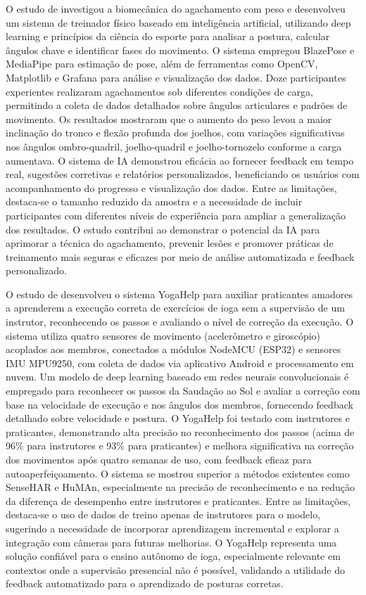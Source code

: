 O estudo de  investigou a biomecânica do agachamento com peso e desenvolveu um sistema de treinador físico baseado em inteligência artificial, utilizando deep learning e princípios da ciência do esporte para analisar a postura, calcular ângulos chave e identificar fases do movimento. O sistema empregou BlazePose e MediaPipe para estimação de pose, além de ferramentas como OpenCV, Matplotlib e Grafana para análise e visualização dos dados. Doze participantes experientes realizaram agachamentos sob diferentes condições de carga, permitindo a coleta de dados detalhados sobre ângulos articulares e padrões de movimento. Os resultados mostraram que o aumento do peso levou a maior inclinação do tronco e flexão profunda dos joelhos, com variações significativas nos ângulos ombro-quadril, joelho-quadril e joelho-tornozelo conforme a carga aumentava. O sistema de IA demonstrou eficácia ao fornecer feedback em tempo real, sugestões corretivas e relatórios personalizados, beneficiando os usuários com acompanhamento do progresso e visualização dos dados. Entre as limitações, destaca-se o tamanho reduzido da amostra e a necessidade de incluir participantes com diferentes níveis de experiência para ampliar a generalização dos resultados. O estudo contribui ao demonstrar o potencial da IA para aprimorar a técnica do agachamento, prevenir lesões e promover práticas de treinamento mais seguras e eficazes por meio de análise automatizada e feedback personalizado.

O estudo de  desenvolveu o sistema YogaHelp para auxiliar praticantes amadores a aprenderem a execução correta de exercícios de ioga sem a supervisão de um instrutor, reconhecendo os passos e avaliando o nível de correção da execução. O sistema utiliza quatro sensores de movimento (acelerômetro e giroscópio) acoplados aos membros, conectados a módulos NodeMCU (ESP32) e sensores IMU MPU9250, com coleta de dados via aplicativo Android e processamento em nuvem. Um modelo de deep learning baseado em redes neurais convolucionais é empregado para reconhecer os passos da Saudação ao Sol e avaliar a correção com base na velocidade de execução e nos ângulos dos membros, fornecendo feedback detalhado sobre velocidade e postura. O YogaHelp foi testado com instrutores e praticantes, demonstrando alta precisão no reconhecimento dos passos (acima de 96\% para instrutores e 93\% para praticantes) e melhora significativa na correção dos movimentos após quatro semanas de uso, com feedback eficaz para autoaperfeiçoamento. O sistema se mostrou superior a métodos existentes como SenseHAR e HuMAn, especialmente na precisão de reconhecimento e na redução da diferença de desempenho entre instrutores e praticantes. Entre as limitações, destaca-se o uso de dados de treino apenas de instrutores para o modelo, sugerindo a necessidade de incorporar aprendizagem incremental e explorar a integração com câmeras para futuras melhorias. O YogaHelp representa uma solução confiável para o ensino autônomo de ioga, especialmente relevante em contextos onde a supervisão presencial não é possível, validando a utilidade do feedback automatizado para o aprendizado de posturas corretas.

